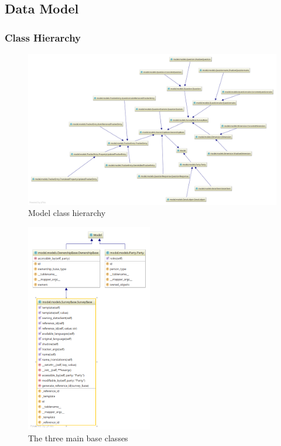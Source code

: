 \documentclass[a4paper,11pt]{article}
\begin{document}
        \subsection{Data Model}
            \subsubsection{Class Hierarchy}
                \begin{figure}
                    \centering
                    \includegraphics[width=\textwidth]{models}
                    \caption{Model class hierarchy}
                    \label{fig:model-dia}
                \end{figure}
                \begin{figure}
                    \centering
                    \includegraphics[width=0.49\textwidth]{base-classes}
                    \caption{The three main base classes}
                    \label{fig:base-classes-dia}
                \end{figure}
\end{document}
